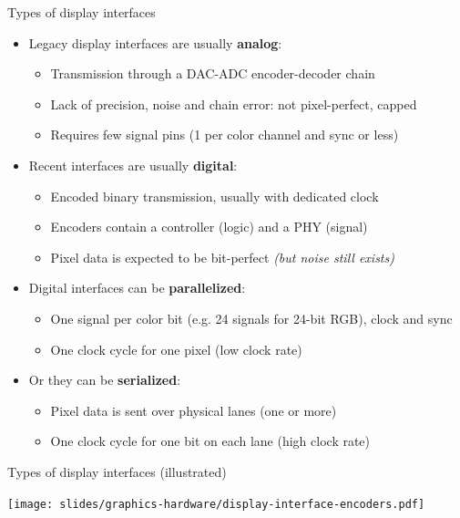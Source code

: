 \begin{frame}{Types of display interfaces}
  \begin{itemize}
  \item Legacy display interfaces are usually \textbf{analog}:
  \begin{itemize}
    \item Transmission through a DAC-ADC encoder-decoder chain
    \item Lack of precision, noise and chain error: not pixel-perfect, capped
    \item Requires few signal pins (1 per color channel and sync or less)
  \end{itemize}
  \item Recent interfaces are usually \textbf{digital}:
    \begin{itemize}
    \item Encoded binary transmission, usually with dedicated clock
    \item Encoders contain a controller (logic) and a PHY (signal)
    \item Pixel data is expected to be bit-perfect \textit{(but noise still exists)}
    \end{itemize}
  \item Digital interfaces can be \textbf{parallelized}:
    \begin{itemize}
    \item One signal per color bit (e.g. 24 signals for 24-bit RGB), clock and sync
    \item One clock cycle for one pixel (low clock rate)
    \end{itemize}
  \item Or they can be \textbf{serialized}:
    \begin{itemize}
    \item Pixel data is sent over physical lanes (one or more)
    \item One clock cycle for one bit on each lane (high clock rate)
    \end{itemize}
  \end{itemize}
\end{frame}

\begin{frame}{Types of display interfaces (illustrated)}
  \begin{center}
    \texttt{[image: slides/graphics-hardware/display-interface-encoders.pdf]}
  \end{center}
\end{frame}

